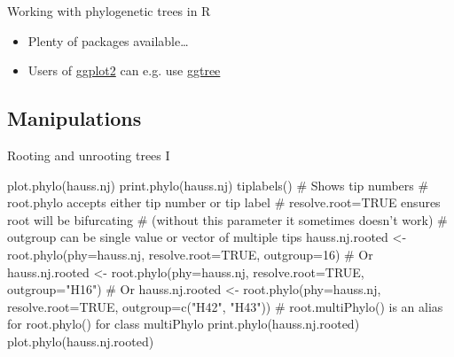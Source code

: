 \documentclass[compress, xelatex, 11pt, xcolor=svgnames, aspectratio=169, url={hyphens, lowtilde}]{beamer}
\begin{document}
\begin{frame}[allowframebreaks]{Working with phylogenetic trees in R}
\begin{itemize}
\begin{itemize}
			\item Plotting two or more trees together to compare topologies (trees from various methods/genes, tree of plants vs. pollinators,~\ldots)
			\item Preparing trees for subsequent analysis (e.g. character evolution) --- removal of outgroup(s), binding of trees (e.g. crown group from one gene and and stem lineages from another), removal of certain taxa,~\ldots
			\item Comparison and evaluation of multiple gene trees, identification of trees with outlying topology
			\item Construction of species tree or network from set of multiple gene trees
			\item And more\ldots
		\end{itemize}
		\item Plenty of packages available\ldots
		\item Users of \href{https://ggplot2.tidyverse.org/}{ggplot2} can e.g. use \href{https://bioconductor.org/packages/release/bioc/html/ggtree.html}{ggtree}
	\end{itemize}
\end{frame}

\subsection{Manipulations}

\begin{frame}[fragile]{Rooting and unrooting trees I}
	\begin{spluscode}
    plot.phylo(hauss.nj)
    print.phylo(hauss.nj)
    tiplabels() # Shows tip numbers
    # root.phylo accepts either tip number or tip label
    # resolve.root=TRUE ensures root will be bifurcating
    # (without this parameter it sometimes doesn't work)
    # outgroup can be single value or vector of multiple tips
    hauss.nj.rooted <- root.phylo(phy=hauss.nj, resolve.root=TRUE,
      outgroup=16) # Or
    hauss.nj.rooted <- root.phylo(phy=hauss.nj, resolve.root=TRUE,
      outgroup="H16") # Or
    hauss.nj.rooted <- root.phylo(phy=hauss.nj, resolve.root=TRUE,
      outgroup=c("H42", "H43"))
    # root.multiPhylo() is an alias for root.phylo() for class multiPhylo
    print.phylo(hauss.nj.rooted)
    plot.phylo(hauss.nj.rooted)
	\end{spluscode}
\end{frame}
\end{document}
